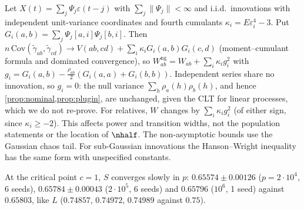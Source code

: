 \begin{remark}\label{rem:nongauss}
Let $X(t)=\sum_j\Psi_j\varepsilon(t-j)$ with $\sum_j\|\Psi_j\|<\infty$ and i.i.d.\ innovations with independent
unit-variance coordinates and fourth cumulants $\kappa_i=E\varepsilon_i^4-3$. Put
$G_i(a,b)=\sum_j\Psi_j[a,i]\Psi_j[b,i]$. Then $n\,\mathrm{Cov}(\tilde\gamma_{ab},\tilde\gamma_{cd})\to
V(ab,cd)+\sum_i\kappa_iG_i(a,b)G_i(c,d)$ (moment--cumulant formula and dominated convergence), so
$W_{ab}^{\mathrm{ng}}=W_{ab}+\sum_i\kappa_ig_i^2$ with $g_i=G_i(a,b)-\frac{\rho_{ab}}2(G_i(a,a)+G_i(b,b))$. Independent
series share no innovation, so $g_i=0$: the null variance $\sum_h\rho_a(h)\rho_b(h)$, and hence
\cref{prop:nominal,prop:plugin}, are unchanged, given the CLT for linear processes, which we do not re-prove. For
relatives, $W$ changes by $\sum_i\kappa_ig_i^2$ (of either sign, since $\kappa_i\ge-2$). This affects power and
transition widths, not the population statements or the location of $\nhalf$. The non-asymptotic bounds use the
Gaussian chaos tail. For sub-Gaussian innovations the Hanson--Wright inequality
\citep[Thm.~1.1]{rudelson2013hanson} has the same form with unspecified constants.
\end{remark}


At the critical point $c=1$, $S$ converges slowly in $p$: $0.65574\pm0.00126$ ($p=2\cdot10^4$, 6 seeds),
$0.65784\pm0.00043$ ($2\cdot10^5$, 6 seeds) and $0.65796$ ($10^6$, 1 seed) against $0.65803$, like $L$
($0.74857$, $0.74972$, $0.74989$ against $0.75$).
